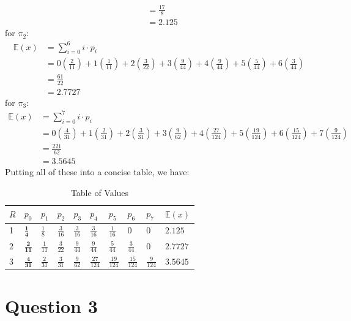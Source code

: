 \documentclass[12pt]{article}
\begin{document}
\begin{align*}
    &= \frac{17}{8} \\ 
    &= 2.125
\end{align*} for $\pi_2$: \begin{align*}
    \mathbb{E}(x) &= \sum_{i=0}^{6} i\cdot p_i \\ 
    &= 0\left( \frac{2}{11} \right) + 1\left( \frac{1}{11} \right) + 2\left( \frac{3}{22} \right) + 3\left( \frac{9}{44} \right) + 4\left( \frac{9}{44} \right) + 5\left( \frac{5}{44} \right) + 6\left( \frac{3}{44} \right)\\ 
    &= \frac{61}{22} \\ 
    &= 2.7727
\end{align*} for $\pi_3$: \begin{align*}
    \mathbb{E}(x) &= \sum_{i=0}^{7} i\cdot p_i \\ 
    &= 0\left( \frac{4}{31} \right) + 1\left( \frac{2}{31} \right) + 2\left( \frac{3}{31} \right) + 3\left( \frac{9}{62} \right) + 4\left( \frac{27}{124} \right) + 5\left( \frac{19}{124} \right) + 6\left( \frac{15}{124} \right)+ 7\left( \frac{9}{124} \right)\\ 
    &= \frac{221}{62} \\ 
    &= 3.5645
\end{align*} Putting all of these into a concise table, we have: \begin{table}[H]
    \centering
    \begin{tabular}{l|l|lllllll | l}
        \toprule 
        $R$ & $p_{0}$ & $p_{1}$ &$p_{2}$ &$p_{3}$ &$p_{4}$ &$p_{5}$ &$p_{6}$ &$p_{7}$ & $ \mathbb{E}(x)$ \\ \midrule 
        1 & $\mathbf{\frac{1}{4}}$& $\frac{1}{8}$& $\frac{3}{16}$& $\frac{3}{16}$& $\frac{3}{16}$& $\frac{1}{16}$& $0$& $0$ & $\mathbf{2.125}$ \\ [6pt]
        2 & $\mathbf{\frac{2}{11}}$& $\frac{1}{11}$& $\frac{3}{22}$& $\frac{9}{44}$& $\frac{9}{44}$& $\frac{5}{44}$& $\frac{3}{44}$& $0$ & $\mathbf{2.7727}$ \\ [6pt]
        3 & $\mathbf{\frac{4}{31}}$& $\frac{2}{31}$& $\frac{3}{31}$& $\frac{9}{62}$& $\frac{27}{124}$& $\frac{19}{124}$& $\frac{15}{124}$& $\frac{9}{124}$ & $\mathbf{3.5645}$ \\ [6pt] \bottomrule
    \end{tabular}
    \caption{Table of Values}
    \label{1-tabvalues}
\end{table}

\newpage

\section*{Question 3}
\end{document}
